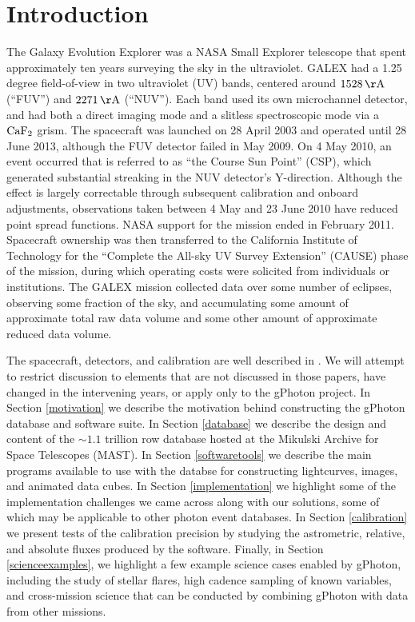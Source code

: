 \documentclass[preprint]{aastex}
\begin{document}
\section{Introduction}
The Galaxy Evolution Explorer \citep[GALEX;][]{mar2005} was a NASA Small Explorer telescope that spent approximately ten years surveying the sky in the ultraviolet. GALEX had a 1.25 degree field-of-view in two ultraviolet (UV) bands, centered around $1528\,\rm{\AA}$ (“FUV”) and $2271\,\rm{\AA}$ (“NUV”). Each band used its own microchannel detector, and had both a direct imaging mode and a slitless spectroscopic mode via a $\rm{CaF_{2}}$ grism. The spacecraft was launched on 28 April 2003 and operated until 28 June 2013, although the FUV detector failed in May 2009. On 4 May 2010, an event occurred that is referred to as ``the Course Sun Point'' (CSP), which generated substantial streaking in the NUV detector's Y-direction. Although the effect is largely correctable through subsequent calibration and onboard adjustments, observations taken between 4 May and 23 June 2010 have reduced point spread functions. NASA support for the mission ended in February 2011. Spacecraft ownership was then transferred to the California Institute of Technology for the “Complete the All-sky UV Survey Extension” (CAUSE) phase of the mission, during which operating costs were solicited from individuals or institutions. The GALEX mission collected data over {\color{red}some number of eclipses}, observing {\color{red}some fraction of the sky}, and accumulating {\color{red}some amount of} approximate total raw data volume and {\color{red}some other amount of} approximate reduced data volume.

The spacecraft, detectors, and calibration are well described in \citet{mor2005,mor2007}. We will attempt to restrict discussion to elements that are not discussed in those papers, have changed in the intervening years, or apply only to the gPhoton project. In Section \ref{motivation} we describe the motivation behind constructing the gPhoton database and software suite. In Section \ref{database} we describe the design and content of the $\sim 1.1$ trillion row database hosted at the Mikulski Archive for Space Telescopes (MAST). In Section \ref{softwaretools} we describe the main programs available to use with the databse for constructing lightcurves, images, and animated data cubes.  In Section \ref{implementation} we highlight some of the implementation challenges we came across along with our solutions, some of which may be applicable to other photon event databases. In Section \ref{calibration} we present tests of the calibration precision by studying the astrometric, relative, and absolute fluxes produced by the software.  Finally, in Section \ref{scienceexamples}, we highlight a few example science cases enabled by gPhoton, including the study of stellar flares, high cadence sampling of known variables, and cross-mission science that can be conducted by combining gPhoton with data from other missions.
\end{document}
